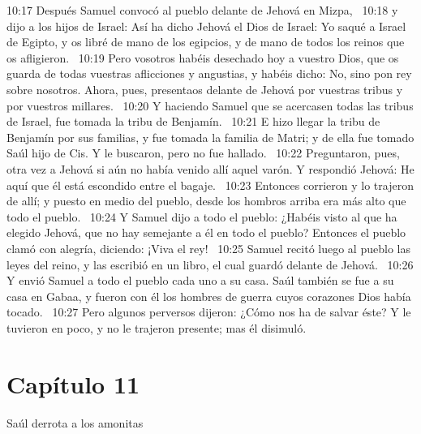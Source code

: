 10:17 Después Samuel convocó al pueblo delante de Jehová en Mizpa,  
10:18 y dijo a los hijos de Israel: Así ha dicho Jehová el Dios de Israel: Yo saqué a Israel de Egipto, y os libré de mano de los egipcios, y de mano de todos los reinos que os afligieron.  
10:19 Pero vosotros habéis desechado hoy a vuestro Dios, que os guarda de todas vuestras aflicciones y angustias, y habéis dicho: No, sino pon rey sobre nosotros. Ahora, pues, presentaos delante de Jehová por vuestras tribus y por vuestros millares.  
10:20 Y haciendo Samuel que se acercasen todas las tribus de Israel, fue tomada la tribu de Benjamín.  
10:21 E hizo llegar la tribu de Benjamín por sus familias, y fue tomada la familia de Matri; y de ella fue tomado Saúl hijo de Cis. Y le buscaron, pero no fue hallado.  
10:22 Preguntaron, pues, otra vez a Jehová si aún no había venido allí aquel varón. Y respondió Jehová: He aquí que él está escondido entre el bagaje.  
10:23 Entonces corrieron y lo trajeron de allí; y puesto en medio del pueblo, desde los hombros arriba era más alto que todo el pueblo.  
10:24 Y Samuel dijo a todo el pueblo: ¿Habéis visto al que ha elegido Jehová, que no hay semejante a él en todo el pueblo? Entonces el pueblo clamó con alegría, diciendo: ¡Viva el rey!  
10:25 Samuel recitó luego al pueblo las leyes del reino, y las escribió en un libro, el cual guardó delante de Jehová.  
10:26 Y envió Samuel a todo el pueblo cada uno a su casa. Saúl también se fue a su casa en Gabaa, y fueron con él los hombres de guerra cuyos corazones Dios había tocado.  
10:27 Pero algunos perversos dijeron: ¿Cómo nos ha de salvar éste? Y le tuvieron en poco, y no le trajeron presente; mas él disimuló.  
\section*{Capítulo 11 }
Saúl derrota a los amonitas  

